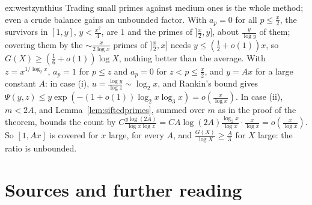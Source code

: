 \begin{solution}{ex:westzynthius}
\idea Trading small primes against medium ones is the whole method; even a crude balance gains an unbounded factor.
\writeup With $a_p=0$ for all $p\le\frac x2$, the survivors in $[1,y]$, $y<\frac{x^2}4$, are $1$ and the primes of $]\frac x2,y]$, about $\frac y{\log y}$ of them; covering them by the $\sim\frac x{2\log x}$ primes of $]\frac x2,x]$ needs $y\le(\frac12+o(1))x$, so $G(X)\ge(\frac16+o(1))\log X$, nothing better than the average. With $z=x^{1/\log_2x}$, $a_p=1$ for $p\le z$ and $a_p=0$ for $z<p\le\frac x2$, and $y=Ax$ for a large constant $A$: in case (i), $u=\frac{\log y}{\log z}\sim\log_2x$, and Rankin's bound gives $\Psi(y,z)\le y\exp(-(1+o(1))\log_2x\log_3x)=o(\frac x{\log x})$. In case (ii), $m<2A$, and Lemma~\ref{lem:siftedprimes}, summed over $m$ as in the proof of the theorem, bounds the count by $C\frac{y\log(2A)}{\log x\log z}=CA\log(2A)\frac{\log_2x}{\log x}\cdot\frac x{\log x}=o(\frac x{\log x})$. So $[1,Ax]$ is covered for $x$ large, for every $A$, and $\frac{G(X)}{\log X}\ge\frac A3$ for $X$ large: the ratio is unbounded.
\end{solution}

\section*{Sources and further reading}

